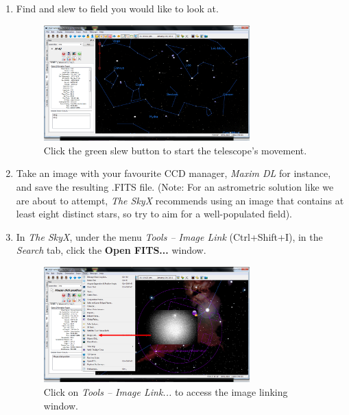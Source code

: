 \documentclass[12pt,twoside,a4paper]{report}
\begin{document}
\begin{enumerate}
 \item Find and slew to field you would like to look at.

 \begin{figure}[ht]
 \centering
    \includegraphics[width=0.75\textwidth]{documentation_images/moving_telescope.png}
    \caption{\label{fig:moving_telescope}Click the green slew button to start the telescope's movement.}
\end{figure}

 \item \label{2} Take an image with your favourite CCD manager, \emph{Maxim DL} for instance, and save the resulting .FITS file. (Note: For an astrometric solution like we are about to attempt, \emph{The SkyX} recommends using an image that contains at least eight distinct stars, so try to aim for a well-populated field).

 \item In \emph{The SkyX}, under the menu \emph{Tools -- Image Link} (Ctrl+Shift+I), in the \emph{Search} tab, click the \textbf{Open FITS...} window.

  \begin{figure}[ht]
 \centering
    \includegraphics[width=0.75\textwidth]{documentation_images/tools_menu_1_1.png}
    \caption{ \label{fig:tools_menu}Click on \emph{Tools -- Image Link...} to access the image linking window.}
  \end{figure}


\end{enumerate}
\end{document}
